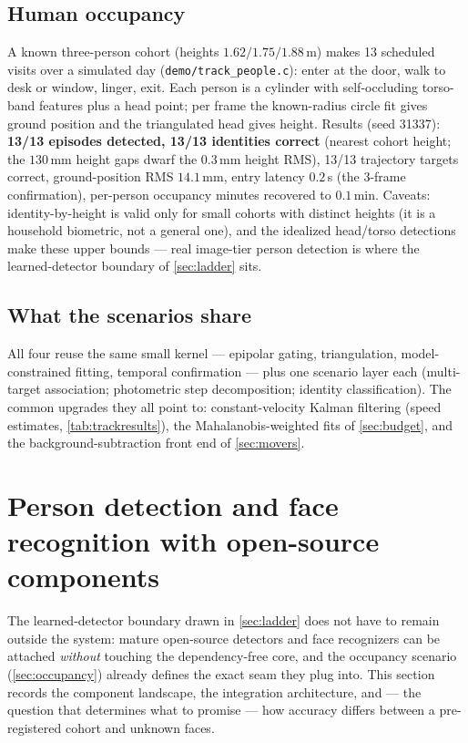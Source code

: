 \documentclass[11pt]{article}
\theoremstyle{definition}
\newcommand{\code}[1]{\texttt{#1}}
\begin{document}
\subsection{Human occupancy}
\label{sec:occupancy}

A known three-person cohort (heights $1.62/1.75/1.88$\,m) makes 13
scheduled visits over a simulated day (\code{demo/track\_people.c}):
enter at the door, walk to desk or window, linger, exit. Each person is
a cylinder with self-occluding torso-band features plus a head point;
per frame the known-radius circle fit gives ground position and the
triangulated head gives height. Results (seed 31337): \textbf{13/13
episodes detected, 13/13 identities correct} (nearest cohort height;
the $130$\,mm height gaps dwarf the $0.3$\,mm height RMS), 13/13
trajectory targets correct, ground-position RMS $14.1$\,mm, entry
latency $0.2$\,s (the 3-frame confirmation), per-person occupancy
minutes recovered to $0.1$\,min. Caveats: identity-by-height is valid
only for small cohorts with distinct heights (it is a household
biometric, not a general one), and the idealized head/torso detections
make these upper bounds --- real image-tier person detection is where
the learned-detector boundary of \autoref{sec:ladder} sits.

\subsection{What the scenarios share}

All four reuse the same small kernel --- epipolar gating, triangulation,
model-constrained fitting, temporal confirmation --- plus one scenario
layer each (multi-target association; photometric step decomposition;
identity classification). The common upgrades they all point to:
constant-velocity Kalman filtering (speed estimates,
\autoref{tab:trackresults}), the Mahalanobis-weighted fits of
\autoref{sec:budget}, and the background-subtraction front end of
\autoref{sec:movers}.

\section{Person detection and face recognition with open-source components}
\label{sec:faces}

The learned-detector boundary drawn in \autoref{sec:ladder} does not have
to remain outside the system: mature open-source detectors and face
recognizers can be attached \emph{without} touching the dependency-free
core, and the occupancy scenario (\autoref{sec:occupancy}) already defines
the exact seam they plug into. This section records the component
landscape, the integration architecture, and --- the question that
determines what to promise --- how accuracy differs between a
pre-registered cohort and unknown faces.
\end{document}
